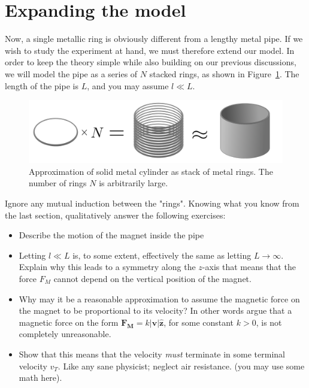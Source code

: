\documentclass[%
oneside,                 %
final,                   %
10pt]{article}
\begin{document}
\section{Expanding the model}
\noindent
Now, a single metallic ring is obviously different from a lengthy metal pipe. If we wish to study the experiment at hand, we must therefore extend our model.
In order to keep the theory simple while also building on our previous discussions, we will model the pipe as a series of $N$ stacked rings, as shown in Figure~\ref{fig:ringcyl}.
The length of the pipe is $L$, and you may assume $l \ll L$.


\begin{figure}[!ht]  %
  \centerline{\includegraphics[width=0.9\linewidth]{figures/ringcyl.png}}
  \caption{
  \label{fig:ringcyl} Approximation of solid metal cylinder as stack of metal rings. The number of rings $N$ is arbitrarily large.
  }
\end{figure}


Ignore any mutual induction between the "rings". Knowing what you know from the last section, qualitatively answer the following exercises:
\begin{itemize}
  \item Describe the motion of the magnet inside the pipe

  \item Letting $l \ll L$ is, to some extent, effectively the same as letting $L \rightarrow \infty$. Explain why this leads to a symmetry along the $z$-axis that means that the force $F_M$ cannot depend on the vertical position of the magnet.

  \item Why may it be a reasonable approximation to assume the magnetic force on the magnet to be proportional to its velocity? In other words argue that a magnetic force on the form  $\mathbf{F_M}=k|\mathbf{v}|\mathbf{\hat{z}}$, for some constant $k>0$, is not completely unreasonable.

  \item Show that this means that the velocity \textit{must} terminate in some terminal velocity $v_T$. Like any sane physicist; neglect air resistance. (you may use some math here).
\end{itemize}
\end{document}
